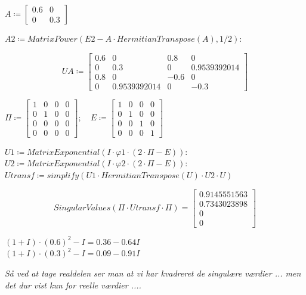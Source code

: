 \documentclass[11pt,a4paper]{article}
\begin{document}
$A \coloneqq \begin{bmatrix} 0.6 & 0 \\ 0 & 0.3 \end{bmatrix}$

$A2 \coloneqq MatrixPower(E2 - A \cdot HermitianTranspose(A), 1/2) :$

\begin{equation}
UA \coloneqq \begin{bmatrix} 
0.6 & 0 & 0.8 & 0 \\ 
0 & 0.3 & 0 & 0.9539392014 \\ 
0.8 & 0 & -0.6 & 0 \\ 
0 & 0.9539392014 & 0 & -0.3 
\end{bmatrix}
\end{equation}

$\Pi \coloneqq \begin{bmatrix} 1 & 0 & 0 & 0 \\ 0 & 1 & 0 & 0 \\ 0 & 0 & 0 & 0 \\ 0 & 0 & 0 & 0 \end{bmatrix}; \quad 
E \coloneqq \begin{bmatrix} 1 & 0 & 0 & 0 \\ 0 & 1 & 0 & 0 \\ 0 & 0 & 1 & 0 \\ 0 & 0 & 0 & 1 \end{bmatrix}$

$U1 \coloneqq MatrixExponential(I \cdot \varphi1 \cdot (2\cdot\Pi - E)) :$ \\
$U2 \coloneqq MatrixExponential(I \cdot \varphi2 \cdot (2\cdot\Pi - E)) :$ \\
$Utransf \coloneqq simplify(U1 \cdot HermitianTranspose(U) \cdot U2 \cdot U)$

\begin{equation}
SingularValues(\Pi \cdot Utransf \cdot \Pi) = \begin{bmatrix} 0.9145551563 \\ 0.7343023898 \\ 0 \\ 0 \end{bmatrix}
\end{equation}

$(1+I)\cdot(0.6)^2 - I = 0.36 - 0.64I$ \\
$(1+I)\cdot(0.3)^2 - I = 0.09 - 0.91I$

\textit{Så ved at tage realdelen ser man at vi har kvadreret de singulære værdier ... men det dur vist kun for reelle værdier ....}
\end{document}
